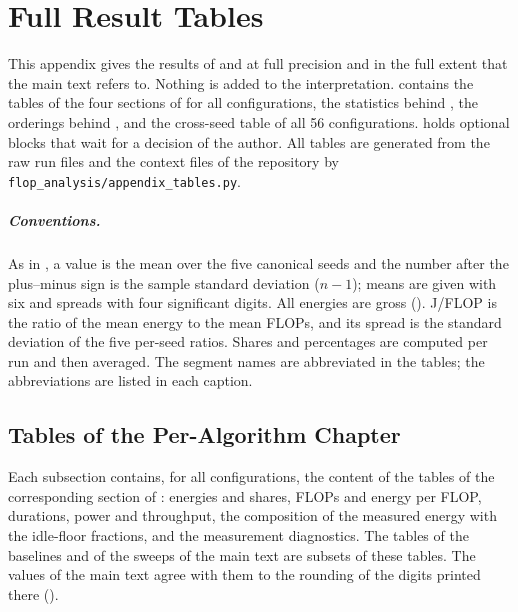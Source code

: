\chapter{Full Result Tables}
\label{app:full-results}

This appendix gives the results of  and  at full precision and in the full extent that the main text refers to.
Nothing is added to the interpretation.
 contains the tables of the four sections of  for all configurations,  the statistics behind ,  the orderings behind , and  the cross-seed table of all \num{56} configurations.
 holds optional blocks that wait for a decision of the author.
All tables are generated from the raw run files and the context files of the repository by \texttt{flop\_analysis/appendix\_tables.py}.

\paragraph{Conventions.} As in , a value is the mean over the five canonical seeds and the number after the plus--minus sign is the sample standard deviation ($n-1$); means are given with six and spreads with four significant digits.
All energies are gross ().
J/FLOP is the ratio of the mean energy to the mean FLOPs, and its spread is the standard deviation of the five per-seed ratios.
Shares and percentages are computed per run and then averaged.
The segment names are abbreviated in the tables; the abbreviations are listed in each caption.

\section{Tables of the Per-Algorithm Chapter}\label{sec:app-full-ch4}

Each subsection contains, for all configurations, the content of the tables of the corresponding section of : energies and shares, FLOPs and energy per FLOP, durations, power and throughput, the composition of the measured energy with the idle-floor fractions, and the measurement diagnostics.
The tables of the baselines and of the sweeps of the main text are subsets of these tables.
The values of the main text agree with them to the rounding of the digits printed there ().

